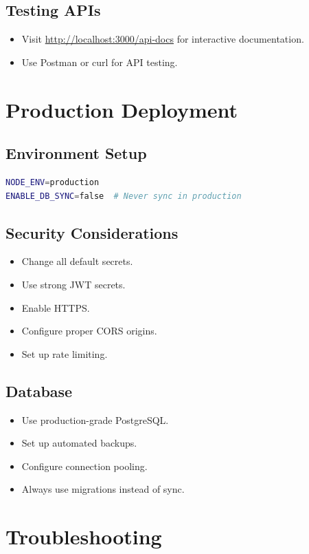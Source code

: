 \subsection{Testing APIs}
\begin{itemize}
    \item Visit \url{http://localhost:3000/api-docs} for interactive documentation.
    \item Use Postman or curl for API testing.
\end{itemize}

\section{Production Deployment}

\subsection{Environment Setup}
\begin{lstlisting}[language=bash]
NODE_ENV=production
ENABLE_DB_SYNC=false  # Never sync in production
\end{lstlisting}

\subsection{Security Considerations}
\begin{itemize}
    \item Change all default secrets.
    \item Use strong JWT secrets.
    \item Enable HTTPS.
    \item Configure proper CORS origins.
    \item Set up rate limiting.
\end{itemize}

\subsection{Database}
\begin{itemize}
    \item Use production-grade PostgreSQL.
    \item Set up automated backups.
    \item Configure connection pooling.
    \item Always use migrations instead of sync.
\end{itemize}

\section{Troubleshooting}

